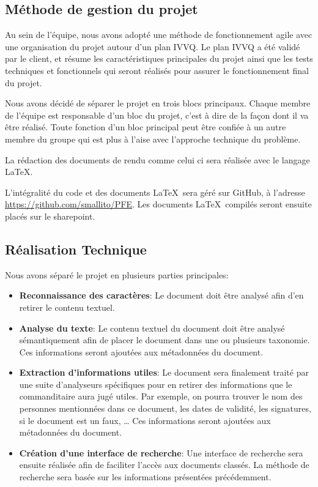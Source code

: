 
\subsection{Méthode de gestion du projet}

Au sein de l'équipe, nous avons adopté une méthode de fonctionnement agile avec une organisation du projet autour d'un plan IVVQ\@.
Le plan IVVQ a été validé par le client, et résume les caractéristiques principales du projet ainsi que les tests techniques et fonctionnels qui seront réalisés pour assurer le fonctionnement final du projet.


Nous avons décidé de séparer le projet en trois blocs principaux.
Chaque membre de l'équipe est responsable d'un bloc du projet, c'est à dire de la façon dont il va être réalisé.
Toute fonction d'un bloc principal peut être confiée à un autre membre du groupe qui est plus à l'aise avec l'approche technique du problème.


La rédaction des documents de rendu comme celui ci sera réalisée avec le langage \LaTeX.


L'intégralité du code et des documents \LaTeX~sera géré sur GitHub, à l'adresse \url{https://github.com/smallito/PFE}.
Les documents \LaTeX~compilés seront ensuite placés sur le sharepoint.



\subsection{Réalisation Technique}

Nous avons séparé le projet en plusieurs parties principales:
\begin{itemize}
\item \textbf{Reconnaissance des caractères}:
Le document doit être analysé afin d'en retirer le contenu textuel.

\item \textbf{Analyse du texte}:
Le contenu textuel du document doit être analysé sémantiquement afin de placer le document dans une ou plusieurs taxonomie. 
Ces informations seront ajoutées aux métadonnées du document.

\item \textbf{Extraction d'informations utiles}:
Le document sera finalement traité par une suite d'analyseurs spécifiques pour en retirer des informations que le commanditaire aura jugé utiles.
Par exemple, on pourra trouver le nom des personnes mentionnées dans ce document, les dates de validité, les signatures, si le document est un faux, \ldots 
Ces informations seront ajoutées aux métadonnées du document.

\item \textbf{Création d'une interface de recherche}:
Une interface de recherche sera ensuite réalisée afin de faciliter l'accès aux documents classés.
La méthode de recherche sera basée sur les informations présentées précédemment.

\end{itemize}





